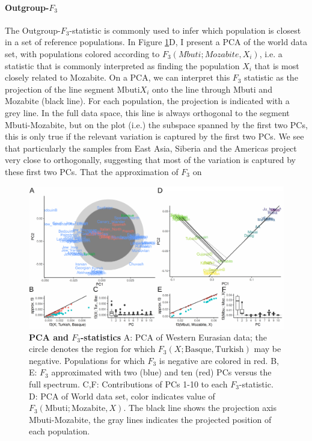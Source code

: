 \documentclass[12pt,a4pape, fullpage]{article}
\begin{document}
\paragraph{Outgroup-$F_3$}
The Outgroup-$F_3$-statistic is commonly used to infer which population is closest in a set of reference populations. In Figure \ref{fig:f3}D, I present a PCA of the world data set, with populations colored according to $F_3(Mbuti; Mozabite, X_i)$, i.e. a statistic that is commonly interpreted as finding the population $X_i$ that is most closely related to Mozabite. On a PCA, we can interpret this $F_3$ statistic as the projection of the line segment $\text{Mbuti}X_i$ onto the line through Mbuti and Mozabite (black line). For each population, the projection is indicated with a grey line. In the full data space, this line is always orthogonal to the segment Mbuti-Mozabite, but on the plot (i.e.) the subspace spanned by the first two PCs, this is only true if the relevant variation is captured by the first two PCs. We see that particularly the samples from East Asia, Siberia and the Americas project very close to orthogonally, suggesting that most of the variation is captured by these first two PCs. That the approximation of $F_3$ on 

\begin{figure}[!ht]
	\includegraphics[width=\textwidth]{figures/fig_f3_data.pdf}
	\caption{\textbf{PCA and $F_3$-statistics} A: PCA of Western Eurasian data; the circle denotes the region for which $F_3(X; \text{Basque}, \text{Turkish})$ may be negative. Populations for which $F_3$ is negative are colored in red. B, E: $F_3$ approximated with two (blue) and ten (red) PCs versus the full spectrum. C,F: Contributions of PCs 1-10 to each $F_3$-statistic. D: PCA of World data set, color indicates value of $F_3(\text{Mbuti}; \text{Mozabite}, X)$. The black line shows the projection axis Mbuti-Mozabite, the gray lines indicates the projected position of each population. }
	\label{fig:f3}
\end{figure}
\end{document}
